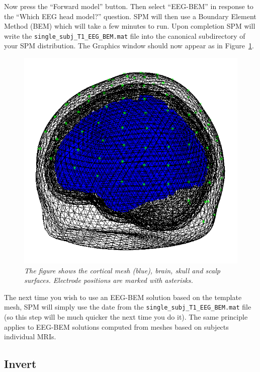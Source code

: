 Now press the ``Forward model'' button. Then select ``EEG-BEM'' in response to the ``Which EEG head model?'' question. SPM will then use a Boundary Element Method (BEM) which will take a few minutes to run. Upon completion SPM will write the \texttt{single\_subj\_T1\_EEG\_BEM.mat} file into the canonical subdirectory of your SPM distribution. The Graphics window should now appear as in Figure~\ref{forward}.
\begin{figure}
\begin{center}
\includegraphics[width=120mm]{mmn/forward}
\caption{\em
The figure shows the cortical mesh (blue), brain, skull and scalp surfaces. Electrode positions are marked with asterisks.
\label{forward}}
\end{center}
\end{figure}
The next time you wish to use an EEG-BEM solution based on the template mesh, SPM will simply use the date from the \texttt{single\_subj\_T1\_EEG\_BEM.mat} file (so this step will be much quicker the next time you do it). The same principle applies to EEG-BEM solutions computed from meshes based on subjects individual MRIs.

\subsection{Invert}

